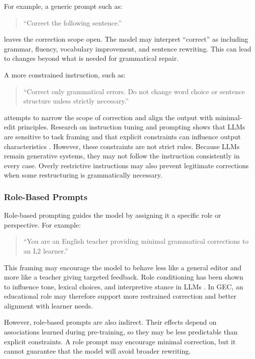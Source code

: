 For example, a generic prompt such as:

\begin{quote}
``Correct the following sentence.''
\end{quote}

leaves the correction scope open. The model may interpret ``correct'' as including grammar, fluency, vocabulary improvement, and sentence rewriting. This can lead to changes beyond what is needed for grammatical repair.

A more constrained instruction, such as:

\begin{quote}
``Correct only grammatical errors. Do not change word choice or sentence structure unless strictly necessary.''
\end{quote}

attempts to narrow the scope of correction and align the output with minimal-edit principles. Research on instruction tuning and prompting shows that LLMs are sensitive to task framing and that explicit constraints can influence output characteristics \cite{wei2022finetuned,liu2023pretrain}. However, these constraints are not strict rules. Because LLMs remain generative systems, they may not follow the instruction consistently in every case. Overly restrictive instructions may also prevent legitimate corrections when some restructuring is grammatically necessary.

\subsubsection{Role-Based Prompts}

Role-based prompting guides the model by assigning it a specific role or perspective. For example:

\begin{quote}
``You are an English teacher providing minimal grammatical corrections to an L2 learner.''
\end{quote}

This framing may encourage the model to behave less like a general editor and more like a teacher giving targeted feedback. Role conditioning has been shown to influence tone, lexical choices, and interpretive stance in LLMs \cite{wei2022finetuned,liu2023pretrain}. In GEC, an educational role may therefore support more restrained correction and better alignment with learner needs.

However, role-based prompts are also indirect. Their effects depend on associations learned during pre-training, so they may be less predictable than explicit constraints. A role prompt may encourage minimal correction, but it cannot guarantee that the model will avoid broader rewriting.

